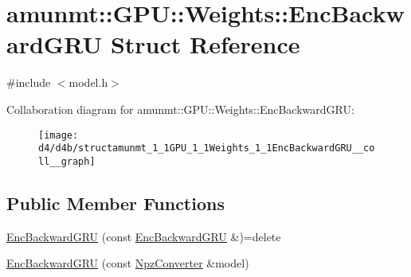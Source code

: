 \hypertarget{structamunmt_1_1GPU_1_1Weights_1_1EncBackwardGRU}{}\section{amunmt\+:\+:G\+PU\+:\+:Weights\+:\+:Enc\+Backward\+G\+RU Struct Reference}
\label{structamunmt_1_1GPU_1_1Weights_1_1EncBackwardGRU}


{\ttfamily \#include $<$model.\+h$>$}



Collaboration diagram for amunmt\+:\+:G\+PU\+:\+:Weights\+:\+:Enc\+Backward\+G\+RU\+:
\nopagebreak
\begin{figure}[H]
\begin{center}
\leavevmode
\texttt{[image: d4/d4b/structamunmt\_1\_1GPU\_1\_1Weights\_1\_1EncBackwardGRU\_\_coll\_\_graph]}
\end{center}
\end{figure}
\subsection*{Public Member Functions}
\begin{DoxyCompactItemize}
\item 
\hyperlink{structamunmt_1_1GPU_1_1Weights_1_1EncBackwardGRU_add8c5037822d5675f0131f52e9568f19}{Enc\+Backward\+G\+RU} (const \hyperlink{structamunmt_1_1GPU_1_1Weights_1_1EncBackwardGRU}{Enc\+Backward\+G\+RU} \&)=delete
\item 
\hyperlink{structamunmt_1_1GPU_1_1Weights_1_1EncBackwardGRU_a9fc9c0151d8a7bb06c8a5e65dd4fca09}{Enc\+Backward\+G\+RU} (const \hyperlink{classamunmt_1_1GPU_1_1NpzConverter}{Npz\+Converter} \&model)
\end{DoxyCompactItemize}
